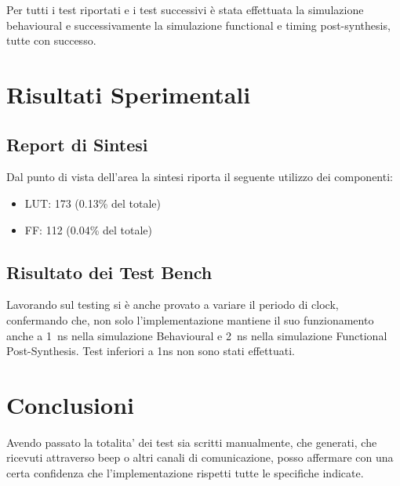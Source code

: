 \documentclass{article}
\begin{document}
Per tutti i test riportati e i test successivi è stata effettuata la simulazione behavioural e successivamente la simulazione functional e timing post-synthesis, tutte con successo.\\

\section{Risultati Sperimentali}
\label{risultati}

\subsection{Report di Sintesi}

Dal punto di vista dell'area la sintesi riporta il seguente utilizzo dei componenti:
\begin{itemize}
\item LUT: 173 (0.13\% del totale)
\item FF: 112 (0.04\% del totale)
\end{itemize}

\subsection{Risultato dei Test Bench}

Lavorando sul testing si è anche provato a variare il periodo di clock, confermando che, non solo l'implementazione mantiene il suo funzionamento anche a \SI{1}{\ns} nella simulazione Behavioural e \SI{2}{\ns} nella simulazione Functional Post-Synthesis. Test inferiori a 1ns non sono stati effettuati.\\

\section{Conclusioni}

Avendo passato la totalita' dei test sia scritti manualmente, che generati, che ricevuti attraverso beep o altri canali di comunicazione, posso affermare con una certa confidenza che l'implementazione rispetti tutte le specifiche indicate.
\end{document}
